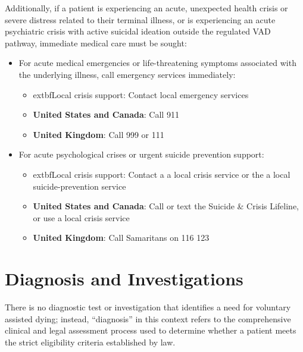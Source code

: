 Additionally, if a patient is experiencing an acute, unexpected health crisis or severe distress related to their terminal illness, or is experiencing an acute psychiatric crisis with active suicidal ideation outside the regulated VAD pathway, immediate medical care must be sought:
\begin{itemize}
    \item For acute medical emergencies or life-threatening symptoms associated with the underlying illness, call emergency services immediately:
    \begin{itemize}
        \item 	extbf{Local crisis support}: Contact local emergency services
        \item \textbf{United States and Canada}: Call 911
        \item \textbf{United Kingdom}: Call 999 or 111
    \end{itemize}
    \item For acute psychological crises or urgent suicide prevention support:
    \begin{itemize}
        \item 	extbf{Local crisis support}: Contact a a local crisis service or the a local suicide-prevention service
        \item \textbf{United States and Canada}: Call or text the Suicide \& Crisis Lifeline, or use a local crisis service
        \item \textbf{United Kingdom}: Call Samaritans on 116 123
    \end{itemize}
\end{itemize}

\section*{Diagnosis and Investigations}
There is no diagnostic test or investigation that identifies a need for voluntary assisted dying; instead, ``diagnosis'' in this context refers to the comprehensive clinical and legal assessment process used to determine whether a patient meets the strict eligibility criteria established by law.

